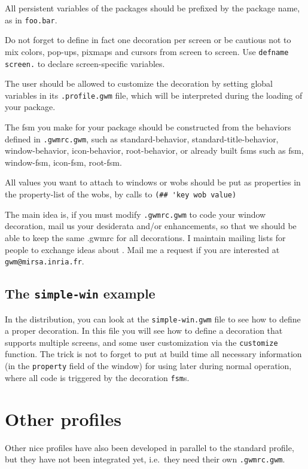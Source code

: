All persistent variables of the packages should be prefixed by the package
name, as in \verb"foo.bar".

Do not forget to define in fact one decoration per screen or be cautious not
to mix colors, pop-ups, pixmaps and cursors from screen to screen. Use 
\verb"defname screen." to declare screen-specific variables.

The user should be allowed to customize the decoration by setting global
variables in its \verb".profile.gwm" file, which will be interpreted during
the loading of your package.

The fsm you make for your package should be constructed from the behaviors
defined in \verb".gwmrc.gwm", such as standard-behavior,
standard-title-behavior, window-behavior, icon-behavior, root-behavior, or
already built fsms such as fsm, window-fsm, icon-fsm, root-fsm.

All values you want to attach to windows or wobs should be put as properties
in the property-list of the wobs, by calls to 
\verb"(## 'key wob value)"

The main idea is, if you must modify {\tt .gwmrc.gwm} to code your window
decoration, mail us your desiderata and/or enhancements, so that we should
be able to keep the same .gwmrc for all decorations.
I maintain mailing lists for people to exchange ideas about {\GWM}. Mail me
a request if you are interested at \verb"gwm@mirsa.inria.fr".

\subsection{The {\tt simple-win} example}

In the distribution, you can look at the \verb|simple-win.gwm| file to see how
to define a proper decoration. In this file you will see how to define a
decoration that supports multiple screens, and some user customization via the
\verb|customize| function. The trick is not to forget to put at build time all
necessary information (in the \verb|property| field of the window) for using
later during normal operation, where all code is triggered by the decoration
\verb|fsm|s.

\section{Other profiles}

Other nice profiles have also been developed in parallel to the standard
profile, but they have not been integrated yet, i.e.\ they need their own
{\tt .gwmrc.gwm}.

